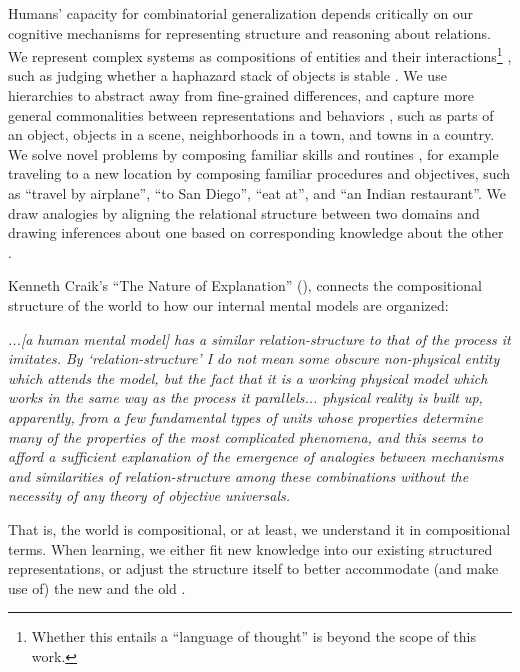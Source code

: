 Humans' capacity for combinatorial generalization depends critically on our cognitive mechanisms for representing structure and reasoning about relations. We represent complex systems as compositions of entities and their interactions\footnote{Whether this entails a ``language of thought'' \citep{fodor1975language} is beyond the scope of this work.} \citep{navon1977forest,mcclelland1981interactive,plaut1996understanding,marcus2001algebraic,goodwin2005reasoning,kemp2008discovery}, such as judging whether a haphazard stack of objects is stable \citep{battaglia2013simulation}.
We use hierarchies to abstract away from fine-grained differences, and capture more general commonalities between representations and behaviors \citep{botvinick2008hierarchical,tenenbaum2011grow}, such as parts of an object, objects in a scene, neighborhoods in a town, and towns in a country. We solve novel problems by composing familiar skills and routines \citep{anderson1982acquisition}, for example traveling to a new location by composing familiar procedures and objectives, such as ``travel by airplane'', ``to San Diego'', ``eat at'', and ``an Indian restaurant''. We draw analogies by aligning the relational structure between two domains and drawing inferences about one based on corresponding knowledge about the other \citep{gentner1997structure,hummel2003symbolic}. 

Kenneth Craik's ``The Nature of Explanation'' (\citeyear{craik1943nature}), connects the compositional structure of the world to how our internal mental models are organized:
\begin{displayquote}
\emph{...[a human mental model] has a similar relation-structure to that of the process it imitates. By `relation-structure' I do not mean some obscure non-physical entity which attends the model, but the fact that it is a working physical model which works in the same way as the process it parallels...
physical reality is built up, apparently, from a few fundamental types of units whose properties determine many of the properties of the most complicated phenomena, and this seems to afford a sufficient explanation of the emergence of analogies between mechanisms and similarities of relation-structure among these combinations without the necessity of any theory of objective universals.} \citep[page 51-55]{craik1943nature}
\end{displayquote}
%
That is, the world is compositional, or at least, we understand it in compositional terms.
When learning, we either fit new knowledge into our existing structured representations, or adjust the structure itself to better accommodate (and make use of) the new and the old \citep{tenenbaum2006theory,griffiths2010probabilistic,ullman2017mind}.

